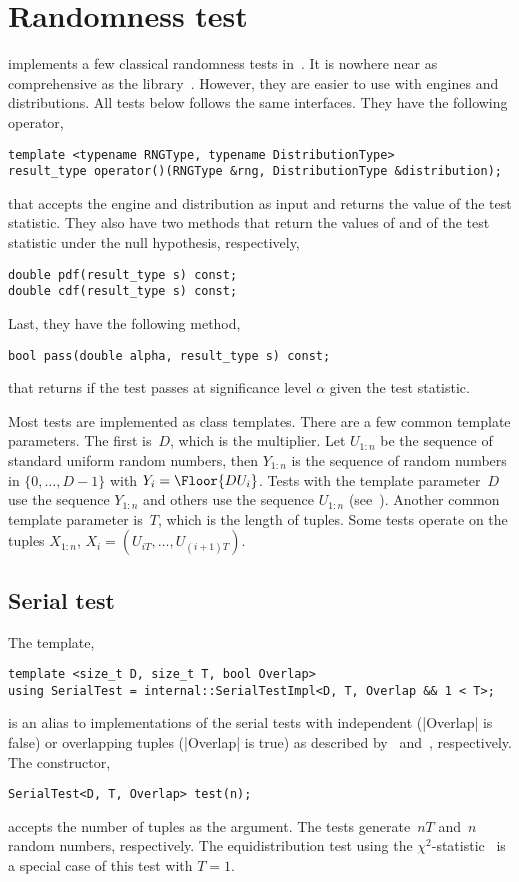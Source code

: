 \section{Randomness test}
\label{sec:Randomness tests}

\mckl implements a few classical randomness tests in~\cite{Knuth:1997us}. It is
nowhere near as comprehensive as the \testu library~\cite{Lecuyer:2007hv}.
However, they are easier to use with \cpp \rng engines and distributions. All
tests below follows the same interfaces. They have the following operator,
\begin{verbatim}
template <typename RNGType, typename DistributionType>
result_type operator()(RNGType &rng, DistributionType &distribution);
\end{verbatim}
that accepts the \rng engine and distribution as input and returns the value of
the test statistic. They also have two methods that return the values of \pdf
and \cdf of the test statistic under the null hypothesis, respectively,
\begin{verbatim}
double pdf(result_type s) const;
double cdf(result_type s) const;
\end{verbatim}
Last, they have the following method,
\begin{verbatim}
bool pass(double alpha, result_type s) const;
\end{verbatim}
that returns if the test passes at significance level $\alpha$ given the test
statistic.

Most tests are implemented as class templates. There are a few common template
parameters. The first is~$D$, which is the multiplier. Let $U_{1:n}$ be the
sequence of standard uniform random numbers, then $Y_{1:n}$ is the sequence of
random numbers in $\{0,\dots,D - 1\}$ with $Y_i = \Floor{DU_i}$. Tests with the
template parameter~$D$ use the sequence $Y_{1:n}$ and others use the sequence
$U_{1:n}$ (see~\cite[pp.~61]{Knuth:1997us}). Another common template parameter
is~$T$, which is the length of tuples. Some tests operate on the tuples
$X_{1:n}$, $X_i = (U_{iT},\dots,U_{(i+1)T})$.

\subsection{Serial test}
\label{sub:Serial test}

The template,
\begin{verbatim}
template <size_t D, size_t T, bool Overlap>
using SerialTest = internal::SerialTestImpl<D, T, Overlap && 1 < T>;
\end{verbatim}
is an alias to implementations of the serial tests with independent (|Overlap|
is false) or overlapping tuples (|Overlap| is true) as described
by~\cite[pp.~62]{Knuth:1997us} and~\cite[ex.~24, pp.~78]{Knuth:1997us},
respectively. The constructor,
\begin{verbatim}
SerialTest<D, T, Overlap> test(n);
\end{verbatim}
accepts the number of tuples as the argument. The tests generate~$nT$ and~$n$
random numbers, respectively. The equidistribution test using the
$\chi^2$-statistic~\cite[pp.~61]{Knuth:1997us} is a special case of this test
with $T = 1$.

